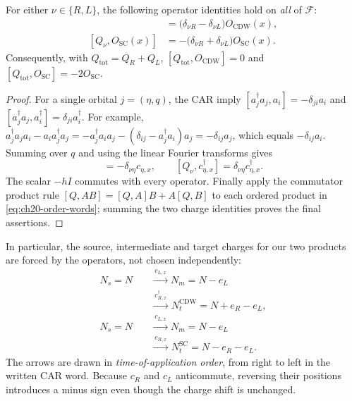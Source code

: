\begin{proposition}
\label{prop:ch20-charge-shifts}
For either \(\nu\in\{R,L\}\), the following operator identities hold on
\emph{all} of \(\mathcal F\):
\begin{align}
 [Q_{\nu},O_{\mathrm{CDW}}(x)]
   &=\bigl(\delta_{\nu R}-\delta_{\nu L}\bigr)
                       O_{\mathrm{CDW}}(x),
 \label{eq:ch20-cdw-charge}\\
 [Q_{\nu},O_{\mathrm{SC}}(x)]
   &=-\bigl(\delta_{\nu R}+\delta_{\nu L}\bigr)
                       O_{\mathrm{SC}}(x).
 \label{eq:ch20-sc-charge}
\end{align}
Consequently, with \(Q_{\mathrm{tot}}=Q_R+Q_L\),
\([Q_{\mathrm{tot}},O_{\mathrm{CDW}}]=0\) and
\([Q_{\mathrm{tot}},O_{\mathrm{SC}}]=-2O_{\mathrm{SC}}\).
\end{proposition}
\begin{proof}
For a single orbital \(j=(\eta,q)\), the CAR imply
\([a_j^{\dagger}a_j,a_i]=-\delta_{ji}a_i\) and
\([a_j^{\dagger}a_j,a_i^{\dagger}]=\delta_{ji}a_i^{\dagger}\).
For example,
\(a_j^{\dagger}a_ja_i-a_i a_j^{\dagger}a_j
 =-a_j^{\dagger}a_i a_j-(\delta_{ij}-a_j^{\dagger}a_i)a_j
 =-\delta_{ij}a_j\), which equals \(-\delta_{ij}a_i\).
Summing over \(q\) and using the linear Fourier transforms gives
\begin{equation}
 [Q_\nu,c_{\eta,x}]=-\delta_{\nu\eta}c_{\eta,x},
 \qquad
 [Q_\nu,c_{\eta,x}^{\dagger}]
       =\delta_{\nu\eta}c_{\eta,x}^{\dagger}.
 \label{eq:ch20-single-charge}
\end{equation}
The scalar \(-hI\) commutes with every operator.  Finally apply the
commutator product rule \([Q,AB]=[Q,A]B+A[Q,B]\) to each ordered
product in \eqref{eq:ch20-order-words}; summing the two charge identities
proves the final assertions.
\end{proof}

In particular, the source, intermediate and target charges for our two
products are forced by the operators, not chosen independently:
\begin{equation}
\begin{aligned}
 N_s=N\quad&\xrightarrow{\ c_{L,x}\ }
       N_m=N-e_L\\[-2pt]
       &\xrightarrow{\ c_{R,x}^{\dagger}\ }
       N_t^{\mathrm{CDW}}=N+e_R-e_L,\\[3pt]
 N_s=N\quad&\xrightarrow{\ c_{L,x}\ }
       N_m=N-e_L\\[-2pt]
       &\xrightarrow{\ c_{R,x}\ }
       N_t^{\mathrm{SC}}=N-e_R-e_L.
\end{aligned}
\label{eq:ch20-charge-arrows}
\end{equation}
The arrows are drawn in \emph{time-of-application order}, from right to
left in the written CAR word.  Because \(c_R\) and \(c_L\)
anticommute, reversing their positions introduces a minus sign even
though the charge shift is unchanged.

